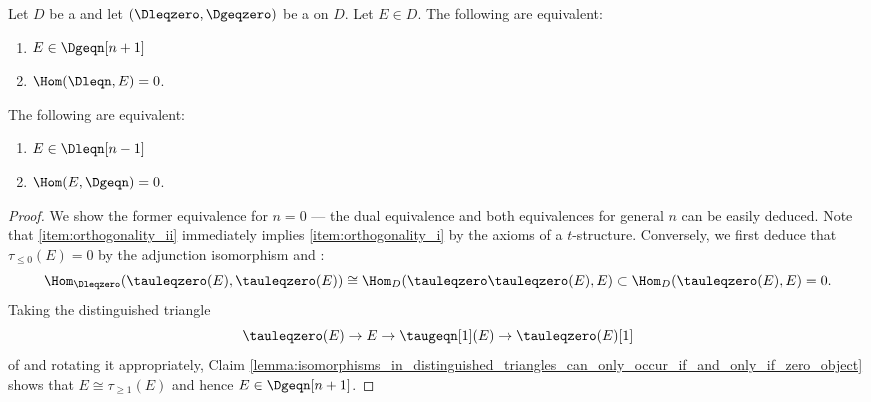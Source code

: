 \begin{lemma} \label{lemma:orthogonality_of_objects_in_triangulated_categories_with_t_structures}
        Let $D$ be a  and let $(\Dleqzero, \Dgeqzero)$ be a  on $D$.
    Let $E \in D$. The following are equivalent:
    \begin{enumerate}
        \item $E \in \Dgeqn[n+1]$ \label{item:orthogonality_i}
        \item $\Hom(\Dleqn, E) = 0$. \label{item:orthogonality_ii}
    \end{enumerate}
    The following are equivalent:
    \begin{enumerate}
        \item $E \in \Dleqn[n-1]$ 
        \item $\Hom(E, \Dgeqn) = 0$. 
    \end{enumerate}
\end{lemma}
\begin{proof}
    We show the former equivalence for $n = 0$ --- the dual equivalence and both equivalences for general $n$ can be easily deduced. Note that \eqref{item:orthogonality_ii} immediately implies \eqref{item:orthogonality_i} by the axioms of a $t$-structure. Conversely, we first deduce that $\tau_{\leq 0}(E) = 0$ by the adjunction isomorphism and :
    $$\Hom_{\Dleqzero}(\tauleqzero(E), \tauleqzero(E)) \cong \Hom_{D}(\tauleqzero \tauleqzero(E), E) \subset \Hom_{D}(\tauleqzero(E), E) = 0.$$
    Taking the distinguished triangle
    $$\tauleqzero(E) \to E \to \taugeqn[1](E) \to \tauleqzero(E)[1]$$
    of  and rotating it appropriately, Claim \ref{lemma:isomorphisms_in_distinguished_triangles_can_only_occur_if_and_only_if_zero_object} shows that $E \cong \tau_{\geq 1}(E)$ and hence $E \in \Dgeqn[n+1]$.
\end{proof}
